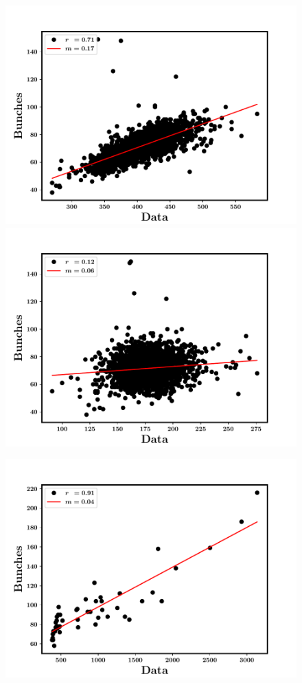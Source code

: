 \begin{figure}
\begin{center}
\includegraphics[scale=0.42]{GRB160821A--BKG_fit}
\includegraphics[scale=0.42]{GRB160821A--BKG_fit--with_Bunchclean}
\end{center}
\begin{center}
\includegraphics[scale=0.4]{GRB160802A--GRB_fit}

\end{center}
\end{figure}
